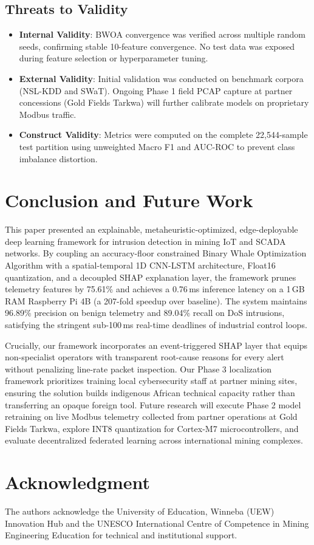 \documentclass[conference]{IEEEtran}
\begin{document}
\subsection{Threats to Validity}
\begin{itemize}
    \item \textbf{Internal Validity}: BWOA convergence was verified across multiple random seeds, confirming stable 10-feature convergence. No test data was exposed during feature selection or hyperparameter tuning.
    \item \textbf{External Validity}: Initial validation was conducted on benchmark corpora (NSL-KDD and SWaT). Ongoing Phase 1 field PCAP capture at partner concessions (Gold Fields Tarkwa) will further calibrate models on proprietary Modbus traffic.
    \item \textbf{Construct Validity}: Metrics were computed on the complete 22,544-sample test partition using unweighted Macro F1 and AUC-ROC to prevent class imbalance distortion.
\end{itemize}

\section{Conclusion and Future Work}
This paper presented an explainable, metaheuristic-optimized, edge-deployable deep learning framework for intrusion detection in mining IoT and SCADA networks. By coupling an accuracy-floor constrained Binary Whale Optimization Algorithm with a spatial-temporal 1D CNN-LSTM architecture, Float16 quantization, and a decoupled SHAP explanation layer, the framework prunes telemetry features by 75.61\% and achieves a 0.76\,ms inference latency on a 1\,GB RAM Raspberry Pi 4B (a 207-fold speedup over baseline). The system maintains 96.89\% precision on benign telemetry and 89.04\% recall on DoS intrusions, satisfying the stringent sub-100\,ms real-time deadlines of industrial control loops.

Crucially, our framework incorporates an event-triggered SHAP layer that equips non-specialist operators with transparent root-cause reasons for every alert without penalizing line-rate packet inspection. Our Phase 3 localization framework prioritizes training local cybersecurity staff at partner mining sites, ensuring the solution builds indigenous African technical capacity rather than transferring an opaque foreign tool. Future research will execute Phase 2 model retraining on live Modbus telemetry collected from partner operations at Gold Fields Tarkwa, explore INT8 quantization for Cortex-M7 microcontrollers, and evaluate decentralized federated learning across international mining complexes.

\section*{Acknowledgment}
The authors acknowledge the University of Education, Winneba (UEW) Innovation Hub and the UNESCO International Centre of Competence in Mining Engineering Education for technical and institutional support.



\end{document}
